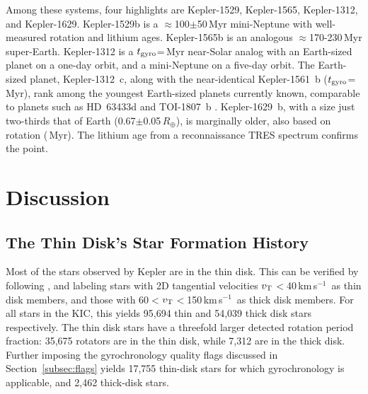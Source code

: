 \documentclass[11pt,twocolumn,tighten,linenumbers,trackchanges]{aastex63}
\newcommand{\kms}{{km\,s$^{-1}$}}
\begin{document}
Among these systems, four highlights are Kepler-1529, Kepler-1565,
Kepler-1312, and Kepler-1629.  Kepler-1529b is a
$\approx$100$\pm$50\,Myr mini-Neptune with well-measured rotation and
lithium ages.  Kepler-1565b is an analogous $\approx$170-230\,Myr
super-Earth.  Kepler-1312 is a $t_{\rm gyro}$=\kepthirteentwelve\,Myr
near-Solar analog with an Earth-sized planet on a one-day orbit, and a
mini-Neptune on a five-day orbit.  The Earth-sized planet,
Kepler-1312~c, along with the near-identical Kepler-1561~b ($t_{\rm
gyro}$=\kepfifteensixone\,Myr), rank among the youngest Earth-sized
planets currently known, comparable to planets such as HD~63433d
\citep[1.1\,$R_\oplus$, $414$$\pm$$23$\,Myr;][]{2024AJ....167...54C}
and TOI-1807~b \citep[1.3\,$R_\oplus$,
180$\pm$40\,Myr;][]{2021AJ....162...54H}.  Kepler-1629~b, with a size
just two-thirds that of Earth (0.67$\pm$0.05\,$R_\oplus$), is
marginally older, also based on rotation (\kepsixteentwonine\,Myr).
The lithium age from a reconnaissance TRES spectrum confirms the
point.


\section{Discussion}
\label{sec:disc}

\subsection{The Thin Disk's Star Formation History}

Most of the stars observed by Kepler are in the thin disk.  This can
be verified by following \citet{Gaia_2018}, and labeling stars with 2D
tangential velocities $v_{\rm T}$$<$40\,\kms\ as thin disk members,
and those with 60$<$$v_{\rm T}$$<$150\,\kms\ as thick disk members.
For all stars in the KIC, this yields 95{,}694 thin and 54{,}039 thick
disk stars respectively.  The thin disk stars have a threefold larger
detected rotation period fraction: 35{,}675 rotators are in the thin
disk, while 7{,}312 are in the thick disk.  Further imposing the
gyrochronology quality flags discussed in Section~\ref{subsec:flags}
yields 17{,}755 thin-disk stars for which gyrochronology is
applicable, and 2{,}462 thick-disk stars.
\end{document}
